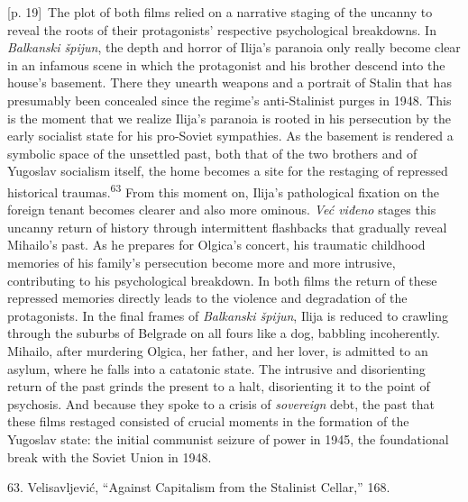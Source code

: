 \documentclass[10pt,a4paper]{article}
\begin{document}
{\scriptsize\color{gray} [p. 19]}\ The plot of both films relied on a narrative staging of the uncanny to reveal the roots of their protagonists’ respective psychological breakdowns. In \textit{Balkanski špijun}, the depth and horror of Ilija’s paranoia only really become clear in an infamous scene in which the protagonist and his brother descend into the house’s basement. There they unearth weapons and a portrait of Stalin that has presumably been concealed since the regime’s anti-Stalinist purges in 1948. This is the moment that we realize Ilija’s paranoia is rooted in his persecution by the early socialist state for his pro-Soviet sympathies. As the basement is rendered a symbolic space of the unsettled past, both that of the two brothers and of Yugoslav socialism itself, the home becomes a site for the restaging of repressed historical traumas.\nobreak\textsuperscript{63} From this moment on, Ilija’s pathological fixation on the foreign tenant becomes clearer and also more ominous. \textit{Već viđeno} stages this uncanny return of history through intermittent flashbacks that gradually reveal Mihailo’s past. As he prepares for Olgica’s concert, his traumatic childhood memories of his family’s persecution become more and more intrusive, contributing to his psychological breakdown. In both films the return of these repressed memories directly leads to the violence and degradation of the protagonists. In the final frames of \textit{Balkanski špijun}, Ilija is reduced to crawling through the suburbs of Belgrade on all fours like a dog, babbling incoherently. Mihailo, after murdering Olgica, her father, and her lover, is admitted to an asylum, where he falls into a catatonic state. The intrusive and disorienting return of the past grinds the present to a halt, disorienting it to the point of psychosis. And because they spoke to a crisis of \textit{sovereign} debt, the past that these films restaged consisted of crucial moments in the formation of the Yugoslav state: the initial communist seizure of power in 1945, the foundational break with the Soviet Union in 1948.\par{\small 63. Velisavljević, “Against Capitalism from the Stalinist Cellar,” 168.\par}
\end{document}
